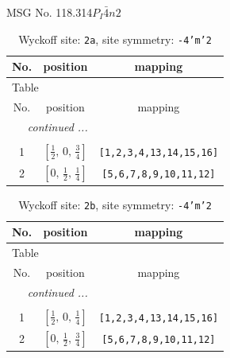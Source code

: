 \documentclass[fleqn,8pt]{jsarticle}
\begin{document}
\setcounter{MaxMatrixCols}{32}

\renewcommand{\tablename}{Table~}
\renewcommand{\figurename}{Figure~}
\begin{center}
\LARGE
MSG No. 118.314\quad$P_{I}\bar{4}n2$
\end{center}
\renewcommand{\arraystretch}{1.2}
\begin{longtable}{ccc}
\caption{Wyckoff site: {\tt 2a}, site symmetry: {\tt -4'm'2}}
 \\
 \hline \hline
No. & position & mapping \\ \hline \endfirsthead

\multicolumn{2}{l}{\tablename\ \thetable{}} \\
 \hline \hline
No. & position & mapping \\ \hline \endhead

 \hline \hline
\multicolumn{2}{r}{\footnotesize\it continued ...} \\ \endfoot

 \hline \hline
\multicolumn{2}{r}{} \\ \endlastfoot

1 & $\left[ \frac{1}{2},\, 0,\, \frac{3}{4} \right]$ & {\tt [1,2,3,4,13,14,15,16]} \\ \hline
2 & $\left[ 0,\, \frac{1}{2},\, \frac{1}{4} \right]$ & {\tt [5,6,7,8,9,10,11,12]} \\
\end{longtable}
\renewcommand{\arraystretch}{1.2}
\begin{longtable}{ccc}
\caption{Wyckoff site: {\tt 2b}, site symmetry: {\tt -4'm'2}}
 \\
 \hline \hline
No. & position & mapping \\ \hline \endfirsthead

\multicolumn{2}{l}{\tablename\ \thetable{}} \\
 \hline \hline
No. & position & mapping \\ \hline \endhead

 \hline \hline
\multicolumn{2}{r}{\footnotesize\it continued ...} \\ \endfoot

 \hline \hline
\multicolumn{2}{r}{} \\ \endlastfoot

1 & $\left[ \frac{1}{2},\, 0,\, \frac{1}{4} \right]$ & {\tt [1,2,3,4,13,14,15,16]} \\ \hline
2 & $\left[ 0,\, \frac{1}{2},\, \frac{3}{4} \right]$ & {\tt [5,6,7,8,9,10,11,12]} \\
\end{longtable}
\end{document}
